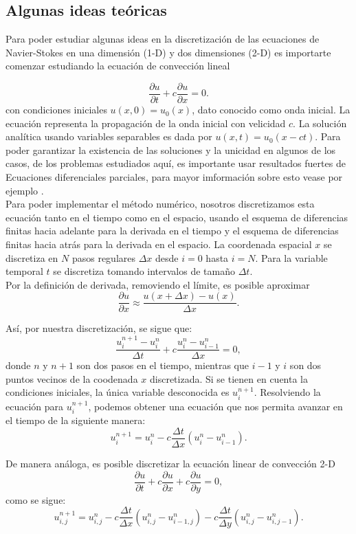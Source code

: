 \documentclass[A4,10pt]{article}
\begin{document}
\begin{multicols}{2}
\section{Algunas ideas teóricas}

Para poder estudiar algunas ideas en la discretización de las ecuaciones de Navier-Stokes en una dimensión (1-D) y dos dimensiones (2-D) es importarte comenzar estudiando la ecuación de convección lineal

$$\frac{\partial u}{\partial t} + c \frac{\partial u}{\partial x} = 0.$$
con condiciones iniciales $u(x,0)=u_0(x)$, dato conocido como onda inicial. La ecuación representa la propagación de la onda inicial con velicidad $c$. La solución analítica usando variables separables es dada por $u(x,t)=u_0(x-ct)$. Para poder garantizar la existencia de las soluciones y la unicidad en algunos de los casos, de los problemas estudiados aquí, es importante usar resultados fuertes de Ecuaciones diferenciales parciales, para mayor imformación sobre esto vease por ejemplo \cite{Girault}.\\


Para poder implementar el método numérico, nosotros discretizamos esta ecuación tanto en el tiempo como en el espacio, usando el esquema de diferencias finitas hacia adelante\cite{Barbagroup,Girault} para la derivada en el tiempo y el esquema de diferencias finitas hacia atrás\cite{Barbagroup,Girault} para la derivada en el espacio. La coordenada espacial $x$ se discretiza en $N$ pasos regulares $\Delta x$ desde $i=0$ hasta $i=N$. Para la variable temporal $t$ se discretiza tomando intervalos de tamaño $\Delta t$.\\
Por la definición de derivada, removiendo el límite, es posible aproximar
$$\frac{\partial u}{\partial x}\approx \frac{u(x+\Delta x)-u(x)}{\Delta x}.$$

Así, por nuestra discretización, se sigue que:
$$\frac{u_i^{n+1}-u_i^n}{\Delta t} + c \frac{u_i^n - u_{i-1}^n}{\Delta x} = 0, $$
donde $n$ y $n+1$ son dos pasos en el tiempo, mientras que $i-1$ y $i$ son dos puntos vecinos de la coodenada $x$ discretizada. Si se tienen en cuenta la condiciones iniciales, la única variable desconocida es $u_i^{n+1}$. Resolviendo la ecuación para $u_i^{n+1}$, podemos obtener una ecuación que nos permita avanzar en el tiempo de la siguiente manera: 
$$u_i^{n+1} = u_i^n - c \frac{\Delta t}{\Delta x}(u_i^n-u_{i-1}^n).$$

De manera análoga, es posible discretizar la ecuación linear de convección 2-D
$$\frac{\partial u}{\partial t}+c\frac{\partial u}{\partial x} + c\frac{\partial u}{\partial y} = 0,$$
como se sigue:
$$u_{i,j}^{n+1} = u_{i,j}^n-c \frac{\Delta t}{\Delta x}(u_{i,j}^n-u_{i-1,j}^n)-c \frac{\Delta t}{\Delta y}(u_{i,j}^n-u_{i,j-1}^n).$$
\\


\end{multicols}
\end{document}
